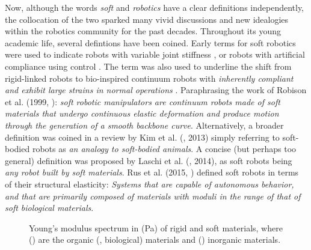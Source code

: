 Now, although the words \emph{soft} and \emph{robotics} have a clear definitions independently, the collocation of the two sparked many vivid discussions and new idealogies within the robotics community for the past decades. Throughout its young academic life, several defintions have been coined. Early terms for soft robotics were used to indicate robots with variable joint stiffness \cite{AlbuSchaffer2004}, or robots with artificial compliance using control \cite{AlbuSchaffer2011}. The term was also used to underline the shift from rigid-linked robots to bio-inspired continuum robots with \textit{inherently compliant and exhibit large strains in normal operations} \cite{Trivedi2008}. Paraphrasing the work of Robison et al. (1999, \cite{Robinson1999}): \textit{soft robotic manipulators are continuum robots made of soft materials that undergo continuous elastic deformation and produce motion through the generation of a smooth backbone curve}. Alternatively, a broader definition was coined in a review by Kim et al. (\cite{Kim2013}, 2013) simply referring to soft-bodied robots as \textit{an analogy to soft-bodied animals}. A concise (but perhaps too general) definition was proposed by Laschi et al. (\cite{Laschi2014}, 2014), as soft robots being \textit{any robot built by soft materials}. Rus et al. (2015, \cite{Rus2015}) defined soft robots in terms of their structural elasticity: \textit{Systems that are capable of autonomous behavior, and that are primarily composed of materials with moduli in the range of that of soft biological materials}.
%
\begin{figure}[!t]
  \ifx\printFigures\undefined
  \else
  \centering
  
  \fi
  \caption{Young's modulus spectrum in (\si{Pa}) of rigid and soft materials, where () are the organic (\ie, biological) materials and () inorganic materials. \label{fig:C0:elasticity}}
  \vspace{-3mm}
\end{figure}
%

